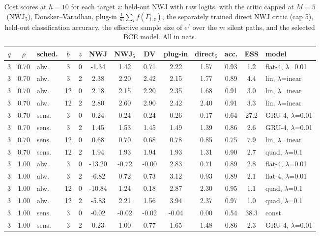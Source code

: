 \documentclass[10pt]{article}
\begin{document}
\begin{table}[htbp]
\centering
\scriptsize
\caption{Cost scores at $h=10$ for each target $z$: held-out NWJ with raw logits, with the critic capped at $M=5$ (NWJ$_5$), Donsker--Varadhan, plug-in $\frac1m\sum_i f(\Gamma_{i,z})$, the separately trained direct NWJ critic (cap 5), held-out classification accuracy, the effective sample size of $e^{f}$ over the $m$ silent paths, and the selected BCE model. All in nats.}\label{tab:cost}
\begin{adjustbox}{max width=\textwidth}
\begin{tabular}{cclcc cccc c cc l}
\toprule
$q$ & $\rho$ & sched. & $b$ & $z$ & NWJ & NWJ$_5$ & DV & plug-in & direct$_5$ & acc. & ESS & model \\
\midrule
3 & 0.70 & alw. & 3 & 0 & -1.34 & 1.42 & 0.71 & 2.22 & 1.57 & 0.93 & 1.2 & flat-4, $\lambda$=0.01 \\
3 & 0.70 & alw. & 3 & 2 & 2.38 & 2.20 & 2.42 & 2.15 & 1.77 & 0.89 & 4.4 & lin, $\lambda$=inear \\
3 & 0.70 & alw. & 12 & 0 & 2.18 & 2.15 & 2.20 & 2.35 & 1.68 & 0.91 & 3.0 & lin, $\lambda$=inear \\
3 & 0.70 & alw. & 12 & 2 & 2.80 & 2.60 & 2.90 & 2.42 & 2.40 & 0.91 & 3.3 & lin, $\lambda$=inear \\
3 & 0.70 & sens. & 3 & 0 & 0.24 & 0.24 & 0.24 & 0.26 & 0.17 & 0.64 & 27.2 & GRU-4, $\lambda$=0.01 \\
3 & 0.70 & sens. & 3 & 2 & 1.45 & 1.53 & 1.45 & 1.49 & 1.39 & 0.86 & 2.6 & GRU-4, $\lambda$=0.01 \\
3 & 0.70 & sens. & 12 & 0 & 0.68 & 0.70 & 0.68 & 0.78 & 0.85 & 0.75 & 7.9 & lin, $\lambda$=inear \\
3 & 0.70 & sens. & 12 & 2 & 1.94 & 1.93 & 1.94 & 1.93 & 1.31 & 0.90 & 2.7 & quad, $\lambda$=0.1 \\
3 & 1.00 & alw. & 3 & 0 & -13.20 & -0.72 & -0.00 & 2.83 & 0.71 & 0.89 & 2.8 & flat-4, $\lambda$=0.01 \\
3 & 1.00 & alw. & 3 & 2 & -6.82 & 0.72 & 0.73 & 3.12 & 0.93 & 0.89 & 2.1 & flat-4, $\lambda$=0.01 \\
3 & 1.00 & alw. & 12 & 0 & -10.84 & 1.24 & 0.18 & 2.87 & 2.30 & 0.95 & 1.1 & quad, $\lambda$=0.1 \\
3 & 1.00 & alw. & 12 & 2 & -5.83 & 2.21 & 1.56 & 3.94 & 2.37 & 0.97 & 1.0 & quad, $\lambda$=0.1 \\
3 & 1.00 & sens. & 3 & 0 & -0.02 & -0.02 & -0.02 & -0.04 & 0.00 & 0.54 & 38.3 & const \\
3 & 1.00 & sens. & 3 & 2 & 0.23 & 1.00 & 0.77 & 1.65 & 1.48 & 0.86 & 2.3 & GRU-4, $\lambda$=0.01 \\

\end{tabular}
\end{adjustbox}
\end{table}
\end{document}
